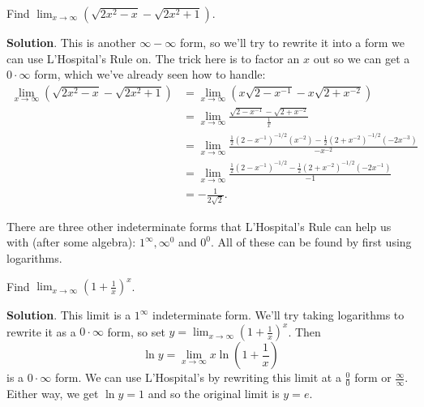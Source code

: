 \documentclass[10pt,]{book}
\theoremstyle{ptxplainnotitle}
\theoremstyle{ptxplaintitle}
\theoremstyle{ptxplainnotitle}
\theoremstyle{ptxplaintitle}
\theoremstyle{ptxplainnotitle}
\theoremstyle{ptxplaintitle}
\theoremstyle{ptxdefinitionnotitle}
\theoremstyle{ptxdefinitiontitle}
\theoremstyle{ptxdefinitionnotitle}
\theoremstyle{ptxdefinitiontitle}
\theoremstyle{ptxdefinitionnotitle}
\theoremstyle{ptxdefinitiontitle}
\theoremstyle{ptxdefinitionnotitle}
\theoremstyle{ptxdefinitiontitle}
\theoremstyle{ptxdefinitionnotitle}
\theoremstyle{ptxdefinitiontitle}
\numberwithin{equation}{section}
\begin{document}
\begin{example}\label{example-limit-involving-radicals}
\hypertarget{p-303}{}%
Find \(\lim_{x\to\infty}(\sqrt{2x^{2} - x} - \sqrt{2x^{2}+1})\).%
\par\smallskip%
\noindent\textbf{Solution}.\hypertarget{solution-68}{}\quad%
\hypertarget{p-304}{}%
This is another \(\infty-\infty\) form, so we'll try to rewrite it into a form we can use L'Hospital's Rule on. The trick here is to factor an \(x\) out so we can get a \(0\cdot\infty\) form, which we've already seen how to handle:%
\begin{align*}
\lim_{x\to\infty}(\sqrt{2x^{2} - x} - \sqrt{2x^{2} + 1}) & = \lim_{x\to\infty}(x\sqrt{2 - x^{-1}} - x\sqrt{2+x^{-2}}) \\
& = \lim_{x\to\infty}\frac{\sqrt{2 - x^{-1}} - \sqrt{2+x^{-2}}}{\frac{1}{x}} \\
& = \lim_{x\to\infty}\frac{\frac{1}{2}(2-x^{-1})^{-1/2}(x^{-2}) - \frac{1}{2}(2+x^{-2})^{-1/2}(-2x^{-3})}{-x^{-2}} \\
& = \lim_{x\to\infty}\frac{\frac{1}{2}(2 - x^{-1})^{-1/2} - \frac{1}{2}(2+x^{-2})^{-1/2}(-2x^{-1})}{-1} \\
& = -\frac{1}{2\sqrt{2}}.
\end{align*}
%
\end{example}
\hypertarget{p-305}{}%
There are three other indeterminate forms that L'Hospital's Rule can help us with (after some algebra): \(1^{\infty}, \infty^{0}\) and \(0^{0}\). All of these can be found by first using logarithms.%
\begin{example}\label{example-a-natural-limit}
\hypertarget{p-306}{}%
Find \(\lim_{x\to\infty}\left(1+\frac{1}{x}\right)^{x}\).%
\par\smallskip%
\noindent\textbf{Solution}.\hypertarget{solution-69}{}\quad%
\hypertarget{p-307}{}%
This limit is a \(1^{\infty}\) indeterminate form. We'll try taking logarithms to rewrite it as a \(0\cdot\infty\) form, so set \(y = \lim_{x\to\infty}\left(1+\frac{1}{x}\right)^{x}\). Then%
\begin{equation*}
\ln y = \lim_{x\to\infty}x\ln\left(1+\frac{1}{x}\right)
\end{equation*}
is a \(0\cdot\infty\) form. We can use L'Hospital's by rewriting this limit at a \(\frac{0}{0}\) form or \(\frac{\infty}{\infty}\). Either way, we get \(\ln y = 1\) and so the original limit is \(y = e\).%
\end{example}
\typeout{************************************************}
\typeout{************************************************}
\end{document}
